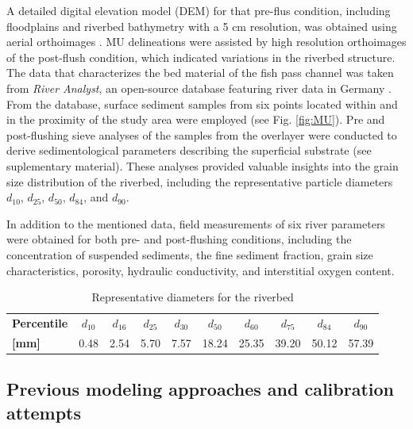 \documentclass[draft,linenumbers,onecolumn]{agujournal2019} %
\begin{document}
A detailed digital elevation model (DEM) for that pre-flus condition, including floodplains and riverbed bathymetry with a 5 cm resolution, was obtained using aerial orthoimages \cite{schwindt2023fuzzylogic}. MU delineations were assisted by high resolution orthoimages of the post-flush condition, which indicated variations in the riverbed structure. The data that characterizes the bed material of the fish pass channel was taken from \textit{River Analyst}, an open-source database featuring river data in Germany \cite{negreiros2023database}. From the database, surface sediment samples from six points located within and in the proximity of the study area were employed (see Fig. \ref{fig:MU}). Pre and post-flushing sieve analyses of the samples from the overlayer were conducted to derive sedimentological parameters describing the superficial substrate (see suplementary material). These analyses provided valuable insights into the grain size distribution of the riverbed, including the representative particle diameters \(d_{10}\), \(d_{25}\), \(d_{50}\), \(d_{84}\), and \(d_{90}\).


In addition to the mentioned data, field measurements of six river parameters were obtained for both pre- and post-flushing conditions, including the concentration of suspended sediments, the fine sediment fraction, grain size characteristics, porosity, hydraulic conductivity, and interstitial oxygen content. 

\begin{table}[ht]
	\centering
	\caption{Representative diameters for the riverbed}
	\begin{tabular}{lccccccccc}
		\hline
		\textbf{Percentile} & \(d_{10}\) & \(d_{16}\) & \(d_{25}\) & \(d_{30}\) & \(d_{50}\) & \(d_{60}\) & \(d_{75}\) & \(d_{84}\) & \(d_{90}\) \\
		\textbf{[mm]}       & 0.48      & 2.54      & 5.70      & 7.57      & 18.24     & 25.35     & 39.20     & 50.12     & 57.39     \\
		\hline
	\end{tabular}
	\label{tab:rep_diameters}
\end{table}


\subsection{Previous modeling approaches and calibration attempts}
\label{sec:Sec2.4}
\end{document}
